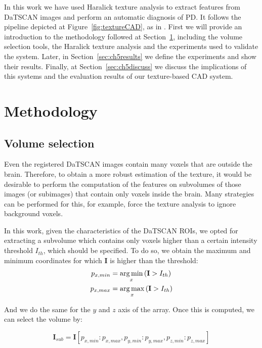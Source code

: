 In this work we have used Haralick texture analysis to extract features from DaTSCAN images and perform an automatic diagnosis of \ac{PD}. It follows the pipeline depicted at Figure~\ref{fig:textureCAD}, as in \cite{Martinez-Murcia2013266,martinez2014parametrization}. First we will provide an introduction to the methodology followed at Section~\ref{sec:methodsCh5}, including the volume selection tools, the Haralick texture analysis and the experiments used to validate the system. Later, in Section~\ref{sec:ch5results} we define the experiments and show their results. Finally, at Section~\ref{sec:ch5discuss} we discuss the implications of this systems and the evaluation results of our texture-based \ac{CAD} system.

\section{Methodology}\label{sec:methodsCh5}

\subsection{Volume selection}\label{sec:volume}
Even the registered DaTSCAN images contain many voxels that are outside the brain. Therefore, to obtain a more robust estimation of the texture, it would be desirable to perform the computation of the features on subvolumes of those images (or subimages) that contain only voxels inside the brain. Many strategies can be performed for this, for example, force the texture analysis to ignore background voxels. 

In this work, given the characteristics of the DaTSCAN \acp{ROI}, we opted for extracting a subvolume which contains only voxels higher than a certain intensity threshold $I_{th}$, which should be specified. To do so, we obtain the maximum and minimum coordinates for which $\mathbf{I}$ is higher than the threshold: 
\begin{align}
	p_{x,min} & = \operatorname*{arg\,min}_x \left( \mathbf{I} > I_{th} \right)\\
	p_{x,max} & = \operatorname*{arg\,max}_x \left( \mathbf{I} > I_{th} \right)
\end{align}

And we do the same for the $y$ and $z$ axis of the array. Once this is computed, we can select the volume by: 

\begin{equation}
	\mathbf{I}_{sub} = \mathbf{I}[p_{x,min}:p_{x,max}, p_{y,min}:p_{y,max}, p_{z,min}:p_{z,max}]
\end{equation}

